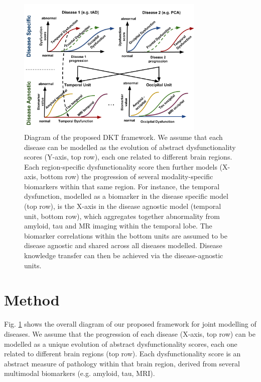 \documentclass{llncs}
\begin{document}
\begin{figure}[h]
 \centering
 \includegraphics[width=0.8\textwidth,trim=0 0 0 0,clip]{figures/disease_knowledge_transfer.pdf}
 \caption{Diagram of the proposed DKT framework. We assume that each disease can be modelled as the evolution of abstract dysfunctionality scores (Y-axis, top row), each one related to different brain regions. Each region-specific dysfunctionality score then further models (X-axis, bottom row) the progression of several modality-specific biomarkers within that same region. For instance, the temporal dysfunction, modelled as a biomarker in the disease specific model (top row), is the X-axis in the disease agnostic model (temporal unit, bottom row), which aggregates together abnormality from amyloid, tau and MR imaging within the temporal lobe. The biomarker correlations within the bottom units are assumed to be disease agnostic and shared across all diseases modelled. Disease knowledge transfer can then be achieved via the disease-agnostic units.}
 \label{fig:diagram}
\end{figure}

\section{Method}

\newcommand{\lp}{\lambda_{d_i}^{\psi(k)}}
\newcommand{\lpuu}{\lambda_{d_i}^{\psi(k),(u)}}
\newcommand{\lpum}{\lambda_{d_i}^{\psi(k),(u-1)}}

Fig. \ref{fig:diagram} shows the overall diagram of our proposed framework for joint modelling of diseases. We assume that the progression of each disease (X-axis, top row) can be modelled as a unique evolution of abstract dysfunctionality scores, each one related to different brain regions (top row). Each dysfunctionality score is an abstract measure of pathology within that brain region, derived from several multimodal biomarkers (e.g. amyloid, tau, MRI). 
\end{document}

